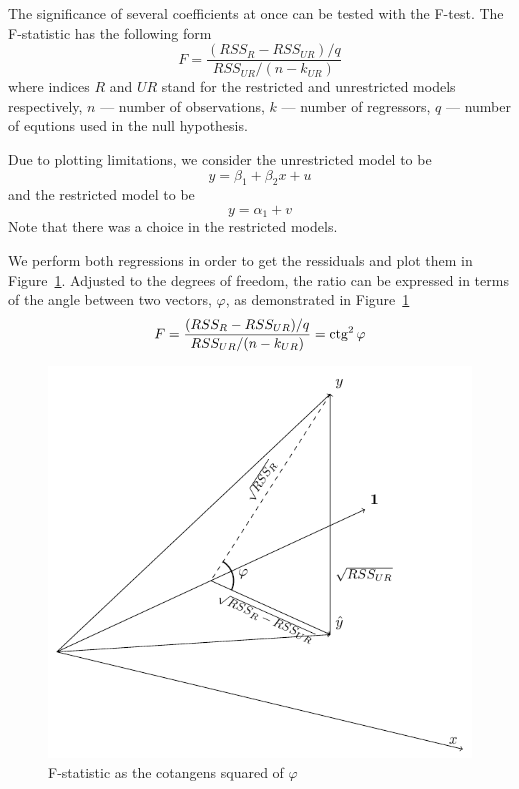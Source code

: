 The significance of several coefficients at once can be tested with the F-test.
The F-statistic has the following form
\[
F = \frac{(RSS_{R} - RSS_{UR})/q}{RSS_{UR}/(n-k_{UR})}
\]
where indices $R$ and $UR$ stand for the restricted and unrestricted models
respectively, $n$ — number of observations, $k$ — number of regressors,
$q$ — number of equtions used in the null hypothesis.

Due to plotting limitations, we consider the unrestricted model to be
\[
y = \beta_1 + \beta_2 x + u
\]
and the restricted model to be
\[
y = \alpha_1 + v
\]
Note that there was a choice in the restricted models.

We perform both regressions in order to get the ressiduals and plot them
in Figure~\ref{fig:ftest}.
Adjusted to the degrees of freedom, the ratio can be expressed in terms of the
angle between two vectors, $\varphi$, as demonstrated in Figure~\ref{fig:ftest}
\[
F = \frac{(RSS_{R} - RSS_{UR})/q}{RSS_{UR}/(n-k_{UR})} = \operatorname{ctg}^2 \varphi
\]

\begin{figure}
\centering
\includegraphics[width=0.55\linewidth]{figures/04_ftest.pdf}
\caption{F-statistic as the cotangens squared of $\varphi$}
\label{fig:ftest}
\end{figure}
